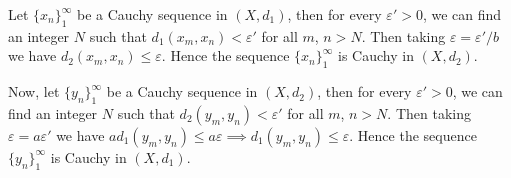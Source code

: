
\begin{solution}
    Let $\{x_n\}_1^\infty$ be a Cauchy sequence
    in $(X,d_1)$, then for every $\varepsilon'>0$,
    we can find an integer $N$ such that
    $d_1(x_m,x_n)<\varepsilon'$ for all $m$, $n>N$.
    Then taking $\varepsilon=\varepsilon'/b$ we
    have $d_2(x_m,x_n)\leq\varepsilon$. Hence
    the sequence $\{x_n\}_1^\infty$ is Cauchy in
    $(X,d_2)$.

    \vspace*{3mm}
    Now, let $\{y_n\}_1^\infty$ be a Cauchy sequence
    in $(X,d_2)$, then for every $\varepsilon'>0$,
    we can find an integer $N$ such that
    $d_2(y_m,y_n)<\varepsilon'$ for all $m$, $n>N$.
    Then taking $\varepsilon=a\varepsilon'$ we
    have $ad_1(y_m,y_n)\leq a\varepsilon
    \implies d_1(y_m,y_n)\leq \varepsilon$. Hence
    the sequence $\{y_n\}_1^\infty$ is Cauchy in
    $(X,d_1)$.
\end{solution}